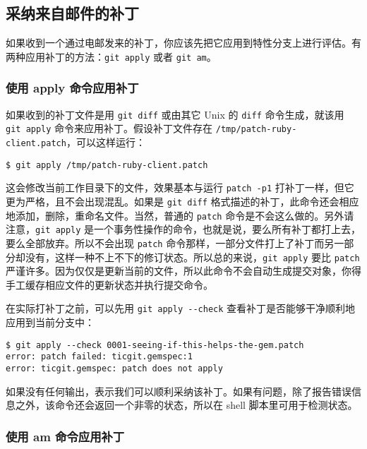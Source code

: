 \documentclass[a4paper]{book}
\begin{document}
\subsection{采纳来自邮件的补丁}

如果收到一个通过电邮发来的补丁，你应该先把它应用到特性分支上进行评估。有两种应用补丁的方法：\texttt{git apply} 或者 \texttt{git am}。

\subsubsection{使用 apply 命令应用补丁}

如果收到的补丁文件是用 \texttt{git diff} 或由其它 Unix 的 \texttt{diff} 命令生成，就该用 \texttt{git apply} 命令来应用补丁。假设补丁文件存在 \texttt{/tmp/patch-ruby-client.patch}，可以这样运行：

\begin{shaded}\begin{verbatim}
$ git apply /tmp/patch-ruby-client.patch
\end{verbatim}\end{shaded}

这会修改当前工作目录下的文件，效果基本与运行 \texttt{patch -p1} 打补丁一样，但它更为严格，且不会出现混乱。如果是 \texttt{git diff} 格式描述的补丁，此命令还会相应地添加，删除，重命名文件。当然，普通的 \texttt{patch} 命令是不会这么做的。另外请注意，\texttt{git apply} 是一个事务性操作的命令，也就是说，要么所有补丁都打上去，要么全部放弃。所以不会出现 \texttt{patch} 命令那样，一部分文件打上了补丁而另一部分却没有，这样一种不上不下的修订状态。所以总的来说，\texttt{git apply} 要比 \texttt{patch} 严谨许多。因为仅仅是更新当前的文件，所以此命令不会自动生成提交对象，你得手工缓存相应文件的更新状态并执行提交命令。

在实际打补丁之前，可以先用 \texttt{git apply -{}-check} 查看补丁是否能够干净顺利地应用到当前分支中：

\begin{shaded}\begin{verbatim}
$ git apply --check 0001-seeing-if-this-helps-the-gem.patch 
error: patch failed: ticgit.gemspec:1
error: ticgit.gemspec: patch does not apply
\end{verbatim}\end{shaded}

如果没有任何输出，表示我们可以顺利采纳该补丁。如果有问题，除了报告错误信息之外，该命令还会返回一个非零的状态，所以在 shell 脚本里可用于检测状态。

\subsubsection{使用 am 命令应用补丁}
\end{document}

